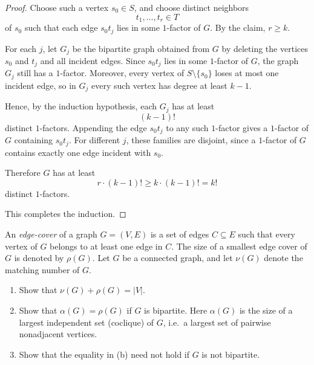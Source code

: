\documentclass[11pt, a4paper]{ctexrep}
\begin{document}
\begin{proof}
    Choose such a vertex $s_0\in S$, and choose distinct neighbors
    \[
        t_1,\dots,t_r\in T
    \]
    of $s_0$ such that each edge $s_0t_j$ lies in some $1$-factor of $G$.
    By the claim, $r\ge k$.

    For each $j$, let $G_j$ be the bipartite graph obtained from $G$ by deleting the
    vertices $s_0$ and $t_j$ and all incident edges. Since $s_0t_j$ lies in some
    $1$-factor of $G$, the graph $G_j$ still has a $1$-factor. Moreover, every vertex of
    $S\setminus\{s_0\}$ loses at most one incident edge, so in $G_j$ every such vertex has
    degree at least $k-1$.

    Hence, by the induction hypothesis, each $G_j$ has at least
    \[
        (k-1)!
    \]
    distinct $1$-factors. Appending the edge $s_0t_j$ to any such $1$-factor gives a
    $1$-factor of $G$ containing $s_0t_j$. For different $j$, these families are disjoint,
    since a $1$-factor of $G$ contains exactly one edge incident with $s_0$.

    Therefore $G$ has at least
    \[
        r\cdot (k-1)! \ge k\cdot (k-1)! = k!
    \]
    distinct $1$-factors.

    This completes the induction.
\end{proof}

\begin{exercise}
    An \emph{edge-cover} of a graph $G=(V,E)$ is a set of edges $C\subseteq E$ such that every vertex of $G$
    belongs to at least one edge in $C$.
    The size of a smallest edge cover of $G$ is denoted by $\rho(G)$.
    Let $G$ be a connected graph, and let $\nu(G)$ denote the matching number of $G$.
    \begin{enumerate}
        \item[(a)] Show that $\nu(G)+\rho(G)=|V|$.
        \item[(b)] Show that $\alpha(G)=\rho(G)$ if $G$ is bipartite.
              Here $\alpha(G)$ is the size of a largest independent set (coclique) of $G$, i.e.\ a largest set of pairwise nonadjacent vertices.
        \item[(c)] Show that the equality in \textup{(b)} need not hold if $G$ is not bipartite.
    \end{enumerate}
\end{exercise}
\end{document}
